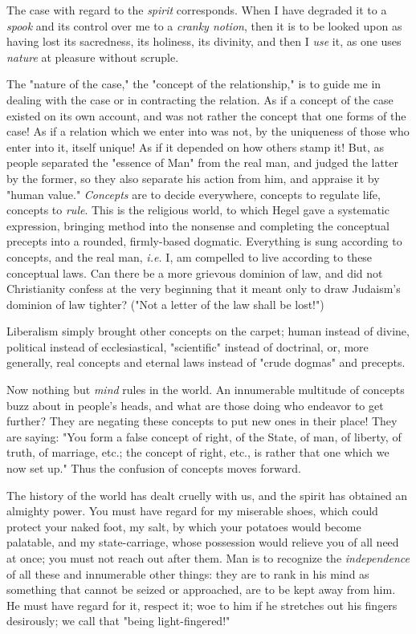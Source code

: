 \documentclass[a4paper]{book}
\begin{document}
The case with regard to the \textit{spirit} corresponds. When I have degraded 
it to a \textit{spook} and its control over me to a \textit{cranky notion}, 
then it is to be looked upon as having lost its sacredness, its holiness, its 
divinity, and then I \textit{use} it, as one uses \textit{nature} at pleasure 
without scruple.

The "{}nature of the case,"{} the "{}concept of the relationship,"{} is to 
guide me in dealing with the case or in contracting the relation. As if a 
concept of the case existed on its own account, and was not rather the concept 
that one forms of the case! As if a relation which we enter into was not, by 
the uniqueness of those who enter into it, itself unique! As if it depended on 
how others stamp it! But, as people separated the "{}essence of Man"{} from 
the real man, and judged the latter by the former, so they also separate his 
action from him, and appraise it by "{}human value."{} \textit{Concepts} are 
to decide everywhere, concepts to regulate life, concepts to \textit{rule}. 
This is the religious world, to which Hegel gave a systematic expression, 
bringing method into the nonsense and completing the conceptual precepts into 
a rounded, firmly-based dogmatic. Everything is sung according to concepts, 
and the real man, \textit{i.e.} I, am compelled to live according to these 
conceptual laws. Can there be a more grievous dominion of law, and did not 
Christianity confess at the very beginning that it meant only to draw 
Judaism's dominion of law tighter? ("{}Not a letter of the law shall be 
lost!"{})

Liberalism simply brought other concepts on the carpet; human instead of 
divine, political instead of ecclesiastical, "{}scientific"{} instead of 
doctrinal, or, more generally, real concepts and eternal laws instead of 
"{}crude dogmas"{} and precepts.

Now nothing but \textit{mind} rules in the world. An innumerable multitude of 
concepts buzz about in people's heads, and what are those doing who endeavor 
to get further? They are negating these concepts to put new ones in their 
place! They are saying: "{}You form a false concept of right, of the State, of 
man, of liberty, of truth, of marriage, etc.; the concept of right, etc., is 
rather that one which we now set up."{} Thus the confusion of concepts moves 
forward.

The history of the world has dealt cruelly with us, and the spirit has 
obtained an almighty power. You must have regard for my miserable shoes, which 
could protect your naked foot, my salt, by which your potatoes would become 
palatable, and my state-carriage, whose possession would relieve you of all 
need at once; you must not reach out after them. Man is to recognize the 
\textit{independence} of all these and innumerable other things: they are to 
rank in his mind as something that cannot be seized or approached, are to be 
kept away from him. He must have regard for it, respect it; woe to him if he 
stretches out his fingers desirously; we call that "{}being light-fingered!"{}
\end{document}
